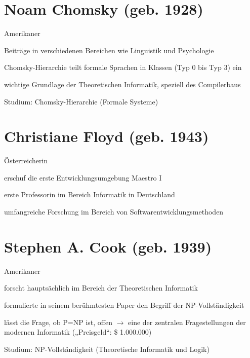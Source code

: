 \documentclass[a4paper,12pt]{report}
\begin{document}
\section*{Noam Chomsky (geb. 1928)}
\begin{itemize*}
    \item Amerikaner
    \item Beiträge in verschiedenen Bereichen wie Linguistik und Psychologie
    \item Chomsky-Hierarchie teilt formale Sprachen in Klassen (Typ 0 bis Typ 3) ein
    \item wichtige Grundlage der Theoretischen Informatik, speziell des Compilerbaus
    \item Studium: Chomsky-Hierarchie (Formale Systeme)
\end{itemize*}

\newpage

\section*{Christiane Floyd (geb. 1943)}
\begin{itemize*}
    \item Österreicherin
    \item erschuf die erste Entwicklungsumgebung Maestro I
    \item erste Professorin im Bereich Informatik in Deutschland
    \item umfangreiche Forschung im Bereich von Softwarentwicklungsmethoden
\end{itemize*}

\section*{Stephen A. Cook (geb. 1939)}
\begin{itemize*}
    \item Amerikaner
    \item forscht hauptsächlich im Bereich der Theoretischen Informatik
    \item formulierte in seinem berühmtesten Paper den Begriff der NP-Vollständigkeit
    \item lässt die Frage, ob P=NP ist, offen $\rightarrow$ eine der zentralen Fragestellungen
          der modernen Informatik („Preisgeld“: \$ 1.000.000)
    \item Studium: NP-Vollständigkeit (Theoretische Informatik und Logik)
\end{itemize*}
\end{document}
